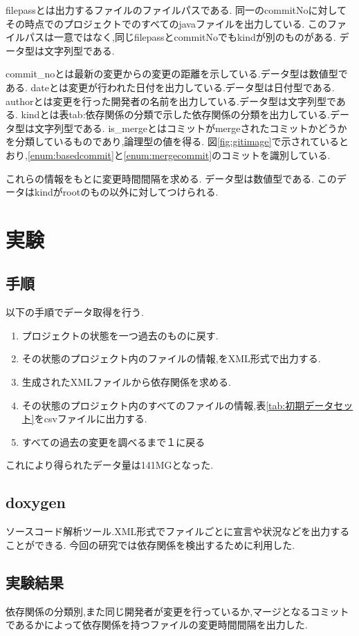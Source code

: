 \documentclass{fose2016}           %
\begin{document}
filepassとは出力するファイルのファイルパスである.
同一のcommitNoに対してその時点でのプロジェクトでのすべてのjavaファイルを出力している.
このファイルパスは一意ではなく,同じfilepassとcommitNoでもkindが別のものがある.
データ型は文字列型である.

commit\_noとは最新の変更からの変更の距離を示している.データ型は数値型である.
dateとは変更が行われた日付を出力している.データ型は日付型である.
authorとは変更を行った開発者の名前を出力している.データ型は文字列型である.
kindとは表{tab:依存関係の分類}で示した依存関係の分類を出力している.データ型は文字列型である.
is\_mergeとはコミットがmergeされたコミットかどうかを分類しているものであり,論理型の値を得る.
図\ref{fig:gitimage}で示されているとおり,\ref{enum:basedcommit}と\ref{enum:mergecommit}のコミットを識別している.


これらの情報をもとに変更時間間隔を求める.
データ型は数値型である.
このデータはkindがrootのもの以外に対してつけられる.

\section{実験}\label{実験}

\subsection{手順}
以下の手順でデータ取得を行う.
\begin{enumerate}
\item プロジェクトの状態を一つ過去のものに戻す.
\item その状態のプロジェクト内のファイルの情報,をXML形式で出力する.
\item 生成されたXMLファイルから依存関係を求める.
\item その状態のプロジェクト内のすべてのファイルの情報,表\ref{tab:初期データセット}をcsvファイルに出力する.
\item すべての過去の変更を調べるまで１に戻る
\end{enumerate}
これにより得られたデータ量は141MGとなった.

\subsection{doxygen}
ソースコード解析ツール.XML形式でファイルごとに宣言や状況などを出力することができる.
今回の研究では依存関係を検出するために利用した.


\subsection{実験結果}
依存関係の分類別,また同じ開発者が変更を行っているか,マージとなるコミットであるかによって依存関係を持つファイルの変更時間間隔を出力した.
\end{document}
